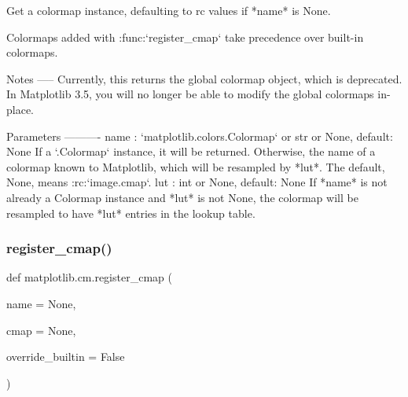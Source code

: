 \begin{DoxyVerb}Get a colormap instance, defaulting to rc values if *name* is None.

Colormaps added with :func:`register_cmap` take precedence over
built-in colormaps.

Notes
-----
Currently, this returns the global colormap object, which is deprecated.
In Matplotlib 3.5, you will no longer be able to modify the global
colormaps in-place.

Parameters
----------
name : `matplotlib.colors.Colormap` or str or None, default: None
    If a `.Colormap` instance, it will be returned. Otherwise, the name of
    a colormap known to Matplotlib, which will be resampled by *lut*. The
    default, None, means :rc:`image.cmap`.
lut : int or None, default: None
    If *name* is not already a Colormap instance and *lut* is not None, the
    colormap will be resampled to have *lut* entries in the lookup table.
\end{DoxyVerb}
 \mbox{\label{namespacematplotlib_1_1cm_aef0b7e3dfd1a5f520c1016f01c1ab0af}} 
\subsubsection{\texorpdfstring{register\+\_\+cmap()}{register\_cmap()}}
{\footnotesize\ttfamily def matplotlib.\+cm.\+register\+\_\+cmap (\begin{DoxyParamCaption}\item[{}]{name = {\ttfamily None},  }\item[{}]{cmap = {\ttfamily None},  }\item[{}]{override\+\_\+builtin = {\ttfamily False} }\end{DoxyParamCaption})}

